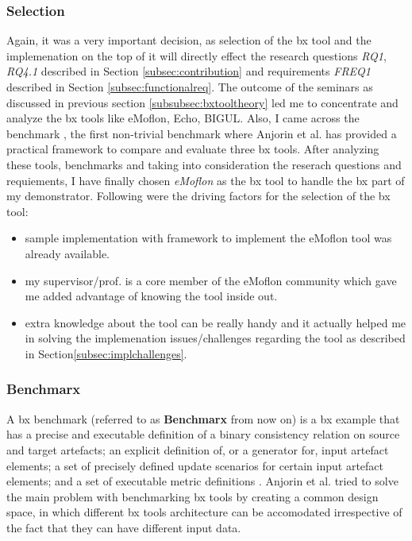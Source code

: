 \subsubsection{Selection}\label{subsubsec:bxtoolselection}
Again, it was a very important decision, as selection of the bx tool and the implemenation on the top of it will directly effect the research questions \textit{RQ1}, \textit{RQ4.1} described in Section \ref{subsec:contribution} and requirements \textit{FREQ1} described in Section \ref{subsec:functionalreq}.
\newline\newline The outcome of the seminars as discussed in previous section \ref{subsubsec:bxtooltheory} led me to concentrate and analyze the bx tools like eMoflon, Echo, BIGUL. Also, I came across the benchmark \cite{benchmarx} \cite{benchmarx-reload}, the first non-trivial benchmark where Anjorin et al. has provided a practical framework to compare and evaluate three bx tools. After analyzing these tools, benchmarks and taking into consideration the reserach questions and requiements, I have finally chosen \textit{eMoflon} as the bx tool to handle the bx part of my demonstrator. Following were the driving factors for the selection of the bx tool:
\begin{itemize}
	\item {sample implementation with framework to implement the eMoflon tool was already available.}
	\item {my supervisor/prof. is a core member of the eMoflon community which gave me added advantage of knowing the tool inside out.}
	\item {extra knowledge about the tool can be really handy and it actually helped me in solving the implemenation issues/challenges regarding the tool as described in Section\ref{subsec:implchallenges}.}
\end{itemize}

\subsubsection{Benchmarx}\label{subsubsec:benchmarx}
A bx benchmark (referred to as \textbf{Benchmarx} from now on) is a bx example that has a precise and executable definition of a binary consistency relation on source and target artefacts; an explicit definition of, or a generator for, input artefact elements; a set of precisely defined update scenarios for certain input artefact elements; and a set of executable metric definitions \cite{bx-theoryandappl}.
\newline\newline Anjorin et al. \cite{benchmarx-reload} tried to solve the main problem with benchmarking bx tools by creating a common design space, in which different bx tools architecture can be accomodated irrespective of the fact that they can have different input data. 
